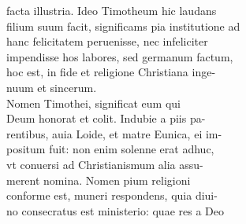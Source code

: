 \documentclass{article}
\begin{document}
\begin{pages}
                facta illustria. Ideo Timotheum hic laudans \\
                filium suum facit, significams pia institutione ad \\
                hanc felicitatem peruenisse, nec infeliciter \\
                impendisse hos labores, sed germanum factum, \\
                hoc est, in fide et religione Christiana inge- \\
                nuum et sincerum. \\
                Nomen Timothei, significat eum qui \\
                Deum honorat et colit. Indubie a piis pa- \\
                rentibus, auia Loide, et matre Eunica, ei im- \\
                positum fuit: non enim solenne erat adhuc, \\
                vt conuersi ad Christianismum alia assu- \\
                merent nomina. Nomen pium religioni \\
                conforme est, muneri respondens, quia diui- \\
                no consecratus est ministerio: quae res a Deo \\
                

\end{pages}
\end{document}
